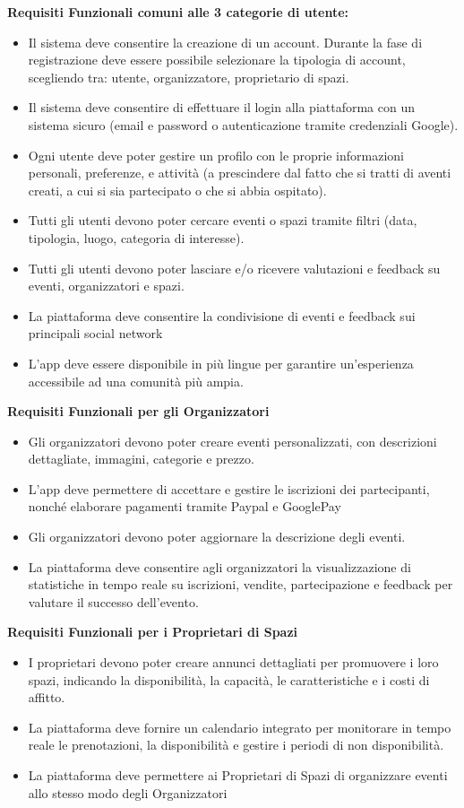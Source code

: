 \documentclass[9pt]{extarticle}
\begin{document}
\textbf{Requisiti Funzionali comuni alle 3 categorie di utente:}
\begin{itemize}
	\item \FR Il sistema deve consentire la creazione di un account. Durante la fase di registrazione deve essere possibile selezionare la tipologia di account, scegliendo tra: utente, organizzatore, proprietario di spazi.
	 \item \FR Il sistema deve consentire di effettuare il login alla piattaforma con un sistema sicuro (email e password o autenticazione tramite credenziali Google). 
	\item \FR Ogni utente deve poter gestire un profilo con le proprie informazioni personali, preferenze, e attività (a prescindere dal fatto che si tratti di aventi creati, a cui si sia partecipato o che si abbia ospitato).
	\item \FR Tutti gli utenti devono poter cercare eventi o spazi tramite filtri (data, tipologia, luogo, categoria di interesse).
	\item \FR Tutti gli utenti devono poter lasciare e/o ricevere valutazioni e feedback su eventi, organizzatori e spazi.
	\item \FR La piattaforma deve consentire la condivisione di eventi e feedback sui principali social network
	\item \FR L'app deve essere disponibile in più lingue per garantire un'esperienza accessibile ad una comunità più ampia.
\end{itemize}



\textbf{Requisiti Funzionali per gli Organizzatori}
\begin{itemize}
	\item \FR Gli organizzatori devono poter creare eventi personalizzati, con descrizioni dettagliate, immagini, categorie e prezzo.
	\item \FR L’app deve permettere di accettare e gestire le iscrizioni dei partecipanti, nonché elaborare pagamenti tramite Paypal e GooglePay
	\item \FR Gli organizzatori devono poter aggiornare la descrizione degli eventi.
	\item \FR La piattaforma deve consentire agli organizzatori la visualizzazione di statistiche in tempo reale su iscrizioni, vendite, partecipazione e feedback per valutare il successo dell’evento.
\end{itemize}

\textbf{Requisiti Funzionali per i Proprietari di Spazi}
\begin{itemize}
	\item \FR I proprietari devono poter creare annunci dettagliati per promuovere i loro spazi, indicando la disponibilità, la capacità, le caratteristiche e i costi di affitto.
	\item \FR La piattaforma deve fornire un calendario integrato per monitorare in tempo reale le prenotazioni, la disponibilità e gestire i periodi di non disponibilità.
    \item \FR La piattaforma deve permettere ai Proprietari di Spazi di organizzare eventi allo stesso modo degli Organizzatori
\end{itemize}
\end{document}
